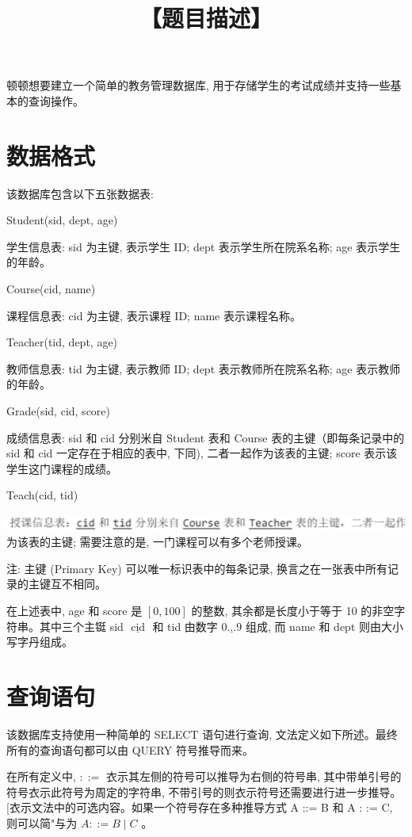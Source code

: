 \documentclass[10pt]{article}
\title{【题目描述】 }
\author{}
\date{}
\begin{document}
\maketitle
顿顿想要建立一个简单的教务管理数据库, 用于存储学生的考试成绩并支持一些基本的查询操作。

\section*{数据格式}
该数据库包含以下五张数据表:

Student(sid, dept, age)

学生信息表: sid 为主键, 表示学生 ID; dept 表示学生所在院系名称; age 表示学生的年龄。

Course(cid, name)

课程信息表: cid 为主键, 表示课程 ID; name 表示课程名称。

Teacher(tid, dept, age)

教师信息表: tid 为主键, 表示教师 ID; dept 表示教师所在院系名称; age 表示教师的年龄。

Grade(sid, cid, score)

成绩信息表: sid 和 cid 分别米自 Student 表和 Course 表的主键（即每条记录中的 sid 和 cid 一定存在于相应的表中, 下同), 二者一起作为该表的主键; score 表示该学生这门课程的成绩。

Teach(cid, tid)

\includegraphics[max width=\textwidth, center]{2024_05_27_59dabe7159470efca570g-1}\\
为该表的主键; 需要注意的是, 一门课程可以有多个老师授课。

注: 主键 (Primary Key) 可以唯一标识表中的每条记录, 换言之在一张表中所有记录的主键互不相同。

在上述表中, age 和 score 是 $[0,100]$ 的整数, 其余都是长度小于等于 10 的非空字符串。其中三个主铤 sid $\underline{\text { cid }}$ 和 tid 由数字 $\underline{0 \ldots 9}$ 组成, 而 name 和 dept 则由大小写字丹组成。

\section*{查询语句}
该数据库支持使用一种简单的 SELECT 语句进行查询, 文法定义如下所述。最终所有的查询语句都可以由 QUERY 符号推导而来。

在所有定义中, $::=$ 衣示其左侧的符号可以推导为右侧的符号串, 其中带单引号的符号衣示此符号为周定的字符串, 不带引号的则衣示符号还需要进行进一步推导。[衣示文法中的可选内容。如果一个符号存在多种推导方式 A ::= B 和 A : := C, 则可以简"与为 $A::=B \mid C$ 。
\end{document}
